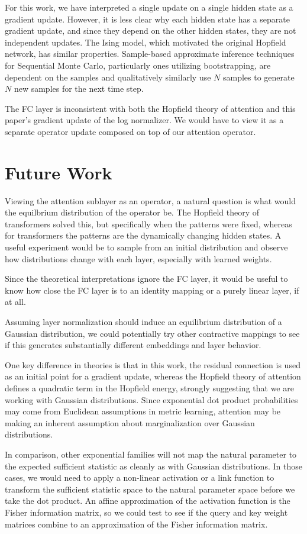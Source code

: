 \documentclass{article}
\begin{document}
For this work, we have interpreted a single update on a single hidden state as a gradient update. 
However, it is less clear why each hidden state has a separate gradient update, and since they depend on the other hidden states, they are not independent updates. The Ising model, which motivated the original Hopfield network, has similar properties. Sample-based approximate inference techniques for Sequential Monte Carlo, particularly ones utilizing bootstrapping, are dependent on the samples and qualitatively similarly use $N$ samples to generate $N$ new samples for the next time step.

The FC layer is inconsistent with both the Hopfield theory of attention and this paper's gradient update of the log normalizer. We would have to view it as a separate operator update composed on top of our attention operator.

\section{Future Work}
\label{future work}
Viewing the attention sublayer as an operator, a natural question is what would the equilbrium distribution of the operator be. 
The Hopfield theory of transformers solved this, but specifically when the patterns were fixed, whereas for transformers the patterns are the dynamically changing hidden states.
A useful experiment would be to sample from an initial distribution and observe how distributions change with each layer, especially with learned weights.


Since the theoretical interpretations ignore the FC layer, it would be useful to know how close the FC layer is to an identity mapping or a purely linear layer, if at all.


Assuming layer normalization should induce an equilibrium distribution of a Gaussian distribution, we could potentially try other contractive mappings to see if this generates substantially different embeddings and layer behavior.

One key difference in theories is that in this work, the residual connection is used as an initial point for a gradient update, whereas the Hopfield theory of attention defines a quadratic term in the Hopfield energy, strongly suggesting that we are working with Gaussian distributions. Since exponential dot product probabilities may come from Euclidean assumptions in metric learning, attention may be making an inherent assumption about marginalization over Gaussian distributions.

In comparison, other exponential families will not map the natural parameter to the expected sufficient statistic as cleanly as with Gaussian distributions. In those cases, we would need to apply a non-linear activation or a link function to transform the sufficient statistic space to the natural parameter space before we take the dot product. An affine approximation of the activation function is the Fisher information matrix, so we could test to see if the query and key weight matrices combine to an approximation of the Fisher information matrix.




\end{document}
